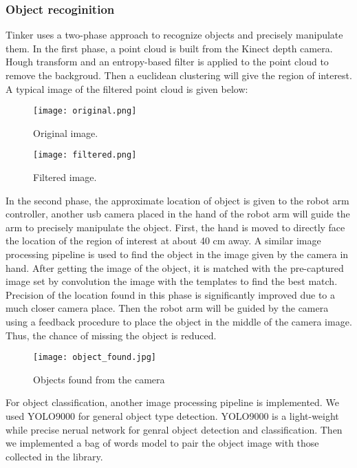 \subsubsection{Object recoginition}
Tinker uses a two-phase approach to recognize objects and precisely manipulate them. In the first phase, a point cloud is built from the Kinect depth camera. Hough transform and an entropy-based filter is applied to the point cloud to remove the backgroud. Then a euclidean clustering will give the region of interest. A typical image of the filtered point cloud is given below:
\begin{figure}[H]
    \centering
    \begin{boxedminipage}{.5\textwidth}
        \centering
        \texttt{[image: original.png]}
        \caption{Original image.}
    \end{boxedminipage}%
    \begin{boxedminipage}{0.5\textwidth}
        \centering
        \texttt{[image: filtered.png]}
        \caption{Filtered image.}
    \end{boxedminipage}
\end{figure}

In the second phase, the approximate location of object is given to the robot arm controller, another usb camera placed in the hand of the robot arm will guide the arm to precisely manipulate the object. First, the hand is moved to directly face the location of the region of interest at about 40 cm away. A similar image processing pipeline is used to find the object in the image given by the camera in hand. After getting the image of the object, it is matched with the pre-captured image set by convolution the image with the templates to find the best match. Precision of the location found in this phase is significantly improved due to a much closer camera place. Then the robot arm will be guided by the camera using a feedback procedure to place the object in the middle of the camera image. Thus, the chance of missing the object is reduced.

\begin{figure}[!t]
	\centering
    \texttt{[image: object\_found.jpg]}
    \caption{Objects found from the camera}
\end{figure}

For object classification, another image processing pipeline is implemented. We used YOLO9000 \cite{1612.08242} for general object type detection. YOLO9000 is a light-weight while precise nerual network for genral object detection and classification. Then we implemented a bag of words model \cite{csurka2004visual} to pair the object image with those collected in the library.
